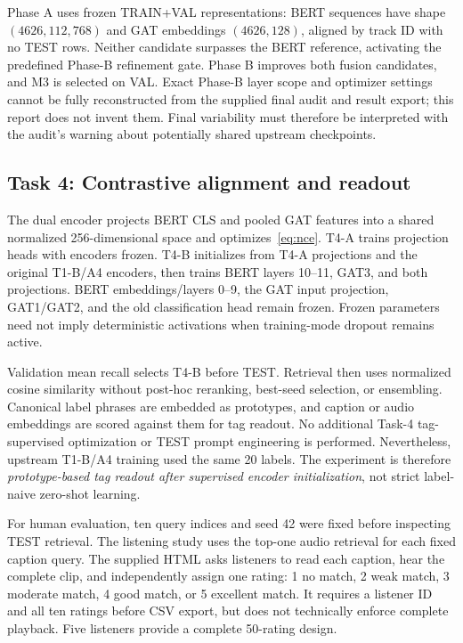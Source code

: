 \documentclass[conference]{IEEEtran}
\begin{document}
Phase A uses frozen TRAIN+VAL representations: BERT sequences have shape $(4626,112,768)$ and GAT embeddings $(4626,128)$, aligned by track ID with no TEST rows. Neither candidate surpasses the BERT reference, activating the predefined Phase-B refinement gate. Phase B improves both fusion candidates, and M3 is selected on VAL. Exact Phase-B layer scope and optimizer settings cannot be fully reconstructed from the supplied final audit and result export; this report does not invent them. Final variability must therefore be interpreted with the audit's warning about potentially shared upstream checkpoints.

\subsection{Task 4: Contrastive alignment and readout}
The dual encoder projects BERT CLS and pooled GAT features into a shared normalized 256-dimensional space and optimizes~\eqref{eq:nce}. T4-A trains projection heads with encoders frozen. T4-B initializes from T4-A projections and the original T1-B/A4 encoders, then trains BERT layers 10--11, GAT3, and both projections. BERT embeddings/layers 0--9, the GAT input projection, GAT1/GAT2, and the old classification head remain frozen. Frozen parameters need not imply deterministic activations when training-mode dropout remains active.

Validation mean recall selects T4-B before TEST. Retrieval then uses normalized cosine similarity without post-hoc reranking, best-seed selection, or ensembling. Canonical label phrases are embedded as prototypes, and caption or audio embeddings are scored against them for tag readout. No additional Task-4 tag-supervised optimization or TEST prompt engineering is performed. Nevertheless, upstream T1-B/A4 training used the same 20 labels. The experiment is therefore \emph{prototype-based tag readout after supervised encoder initialization}, not strict label-naive zero-shot learning.

For human evaluation, ten query indices and seed 42 were fixed before inspecting TEST retrieval. The listening study uses the top-one audio retrieval for each fixed caption query. The supplied HTML asks listeners to read each caption, hear the complete clip, and independently assign one rating: 1 no match, 2 weak match, 3 moderate match, 4 good match, or 5 excellent match. It requires a listener ID and all ten ratings before CSV export, but does not technically enforce complete playback. Five listeners provide a complete 50-rating design.
\end{document}
